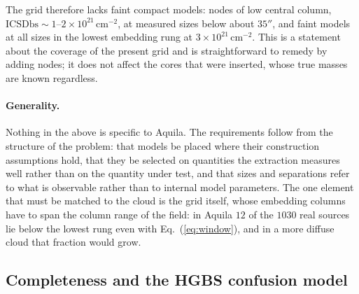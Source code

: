 \documentclass[11pt,a4paper]{article}
\begin{document}
The grid therefore lacks faint compact models: nodes of low central column,
$\mathrm{ICSDbs}\sim1$--$2\times10^{21}\,\mathrm{cm^{-2}}$, at measured sizes
below about $35''$, and faint models at all sizes in the lowest embedding rung
at $3\times10^{21}\,\mathrm{cm^{-2}}$. This is a statement about the coverage
of the present grid and is straightforward to remedy by adding nodes; it does
not affect the cores that were inserted, whose true masses are known
regardless. 

\paragraph{Generality.}
Nothing in the above is specific to Aquila. The requirements follow from the
structure of the problem: that models be placed where their construction
assumptions hold, that they be selected on quantities the extraction measures
well rather than on the quantity under test, and that sizes and separations
refer to what is observable rather than to internal model parameters. The one
element that must be matched to the cloud is the grid itself, whose embedding
columns have to span the column range of the field: in Aquila $12$ of the
$1030$ real sources lie below the lowest rung even with Eq.~(\ref{eq:window}),
and in a more diffuse cloud that fraction would grow.


\subsection{Completeness and the HGBS confusion model}
\label{sec:completeness}
\end{document}
